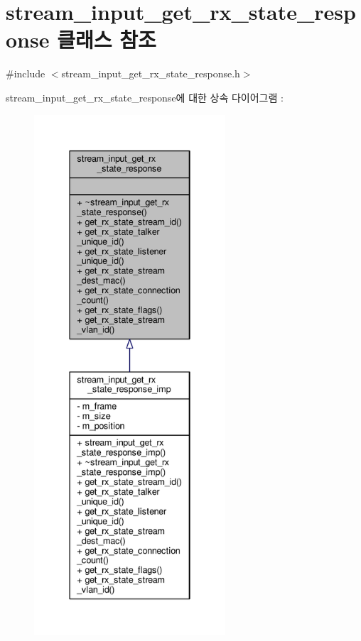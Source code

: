 \hypertarget{classavdecc__lib_1_1stream__input__get__rx__state__response}{}\section{stream\+\_\+input\+\_\+get\+\_\+rx\+\_\+state\+\_\+response 클래스 참조}
\label{classavdecc__lib_1_1stream__input__get__rx__state__response}


{\ttfamily \#include $<$stream\+\_\+input\+\_\+get\+\_\+rx\+\_\+state\+\_\+response.\+h$>$}



stream\+\_\+input\+\_\+get\+\_\+rx\+\_\+state\+\_\+response에 대한 상속 다이어그램 \+: 
\nopagebreak
\begin{figure}[H]
\begin{center}
\leavevmode
\includegraphics[height=550pt]{classavdecc__lib_1_1stream__input__get__rx__state__response__inherit__graph}
\end{center}
\end{figure}



